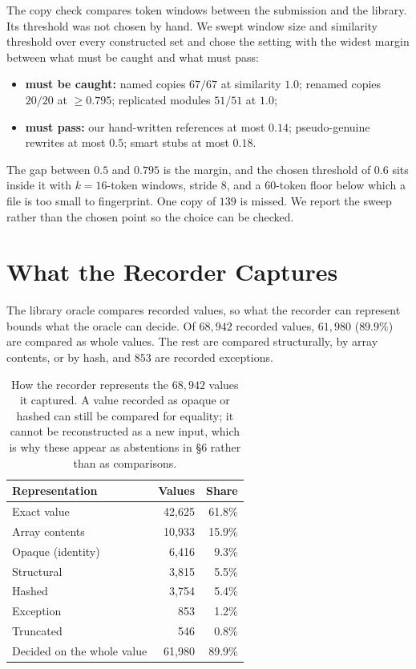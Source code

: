 The copy check compares token windows between the submission and the
library. Its threshold was not chosen by hand. We swept window size and
similarity threshold over every constructed set and chose the setting
with the widest margin between what must be caught and what must pass:

\begin{itemize}\itemsep2pt
\item \textbf{must be caught:} named copies $67/67$ at similarity
      $1.0$; renamed copies $20/20$ at $\geq 0.795$; replicated
      modules $51/51$ at $1.0$;
\item \textbf{must pass:} our hand-written references at most $0.14$;
      pseudo-genuine rewrites at most $0.5$; smart stubs at most $0.18$.
\end{itemize}

The gap between $0.5$ and $0.795$ is the margin, and the chosen
threshold of $0.6$ sits inside it with $k{=}16$-token windows, stride
$8$, and a $60$-token floor below which a file is too small to
fingerprint. One copy of $139$ is missed. We report the sweep rather
than the chosen point so the choice can be checked.

\section{What the Recorder Captures}
\label{app:fidelity}

The library oracle compares recorded values, so what the recorder can
represent bounds what the oracle can decide. Of $68{,}942$ recorded
values, $61{,}980$ ($89.9\%$) are compared as whole values. The rest
are compared structurally, by array contents, or by hash, and $853$ are
recorded exceptions.

\begin{table}[t]
\centering\small
\begin{tabular}{@{}lrr@{}}
\toprule
Representation & Values & Share \\
\midrule
Exact value        & 42{,}625 & 61.8\% \\
Array contents     & 10{,}933 & 15.9\% \\
Opaque (identity)  &  6{,}416 &  9.3\% \\
Structural         &  3{,}815 &  5.5\% \\
Hashed             &  3{,}754 &  5.4\% \\
Exception          &    853 &  1.2\% \\
Truncated          &    546 &  0.8\% \\
\midrule
Decided on the whole value & 61{,}980 & 89.9\% \\
\bottomrule
\end{tabular}
\caption{How the recorder represents the $68{,}942$ values it captured.
A value recorded as opaque or hashed can still be compared for
equality; it cannot be reconstructed as a new input, which is why
these appear as abstentions in \S6 rather than as comparisons.}
\label{tab:fidelity}
\end{table}

